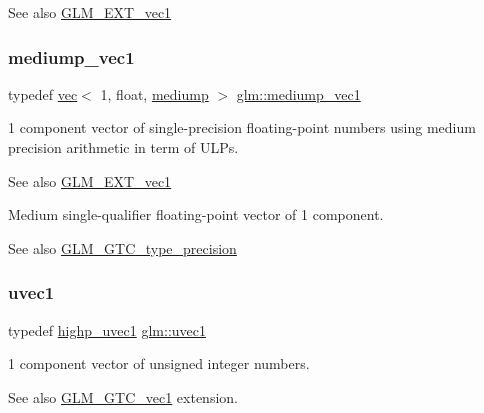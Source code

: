 \begin{DoxySeeAlso}{See also}
\mbox{\hyperlink{group__ext__vec1}{G\+L\+M\+\_\+\+E\+X\+T\+\_\+vec1}} 
\end{DoxySeeAlso}
\mbox{\label{group__ext__vec1_gab1c2ec8c0cbca8b1f2346f37926b77a7}} 
\subsubsection{\texorpdfstring{mediump\+\_\+vec1}{mediump\_vec1}}
{\footnotesize\ttfamily typedef \mbox{\hyperlink{structglm_1_1vec}{vec}}$<$ 1, float, \mbox{\hyperlink{namespaceglm_a36ed105b07c7746804d7fdc7cc90ff25a6416f3ea0c9025fb21ed50c4d6620482}{mediump}} $>$ \mbox{\hyperlink{group__ext__vec1_gab1c2ec8c0cbca8b1f2346f37926b77a7}{glm\+::mediump\+\_\+vec1}}}

1 component vector of single-\/precision floating-\/point numbers using medium precision arithmetic in term of U\+L\+Ps.

\begin{DoxySeeAlso}{See also}
\mbox{\hyperlink{group__ext__vec1}{G\+L\+M\+\_\+\+E\+X\+T\+\_\+vec1}}
\end{DoxySeeAlso}
Medium single-\/qualifier floating-\/point vector of 1 component. \begin{DoxySeeAlso}{See also}
\mbox{\hyperlink{group__gtc__type__precision}{G\+L\+M\+\_\+\+G\+T\+C\+\_\+type\+\_\+precision}} 
\end{DoxySeeAlso}
\mbox{\label{group__ext__vec1_ga4e12bc23a3d060164eef452f81d92a03}} 
\subsubsection{\texorpdfstring{uvec1}{uvec1}}
{\footnotesize\ttfamily typedef \mbox{\hyperlink{group__ext__vec1_ga4e92a1105fa908e8a96971602381e381}{highp\+\_\+uvec1}} \mbox{\hyperlink{group__ext__vec1_ga4e12bc23a3d060164eef452f81d92a03}{glm\+::uvec1}}}

1 component vector of unsigned integer numbers. \begin{DoxySeeAlso}{See also}
\mbox{\hyperlink{group__gtc__vec1}{G\+L\+M\+\_\+\+G\+T\+C\+\_\+vec1}} extension. 
\end{DoxySeeAlso}
\mbox{\label{group__ext__vec1_ga16030dae9029ed1eab1553a2183bbb79}} 
